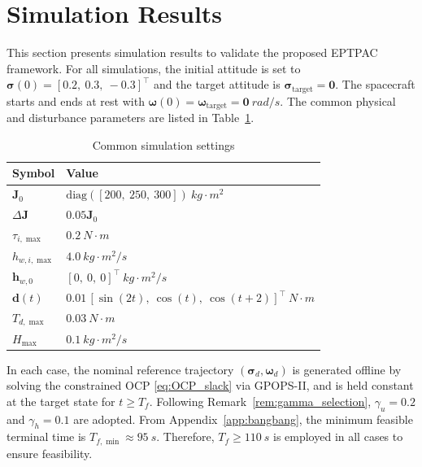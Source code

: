 \documentclass[journal]{new-aiaa}
\begin{document}

\section{Simulation Results}
\label{section:simulation}

This section presents simulation results to validate the proposed EPTPAC framework.
For all simulations, the initial attitude is set to $\boldsymbol{\sigma}(0)=[0.2,\ 0.3,\ -0.3]^\top$ and the target attitude is $\boldsymbol{\sigma}_{\mathrm{target}}=\boldsymbol{0}$. The spacecraft starts and ends at rest with $\boldsymbol{\omega}(0)=\boldsymbol{\omega}_{\mathrm{target}}=\boldsymbol{0}~\si{rad/s}$.
The common physical and disturbance parameters are listed in Table~\ref{tab:sim_setup_all}.

\begin{table}[ht]
\centering
\caption{Common simulation settings}
\label{tab:sim_setup_all}
\begin{tabular}{@{}l l@{}}
\toprule
\textbf{Symbol} & \textbf{Value} \\
\midrule
$\boldsymbol{J}_0$ &
$\mathrm{diag}([200,\ 250,\ 300])~\si{kg\cdot m^2}$ \\
$\Delta\boldsymbol{J}$ &
$0.05 \boldsymbol{J}_0 $ \\
$\tau_{i,\max}$ &
$\SI{0.2}{N\cdot m}$ \\
$h_{w,i,\max}$ &
$\SI{4.0}{kg\cdot m^2/s}$ \\
$\boldsymbol{h}_{w,0}$ &
$[0,\ 0,\ 0]^\top~\si{kg\cdot m^2/s}$ \\
$\boldsymbol{d}(t)$ &
$0.01\,[\sin(2t),\ \cos(t),\ \cos(t+2)]^\top~\si{N\cdot m}$ \\
$T_{d,\max}$ &
$\SI{0.03}{N\cdot m}$ \\
$H_{\max}$ &
$\SI{0.1}{kg\cdot m^2/s}$ \\\bottomrule
\end{tabular}
\end{table}

In each case, the nominal reference trajectory $(\boldsymbol{\sigma}_d,\boldsymbol{\omega}_d)$ is generated offline by solving the constrained OCP \eqref{eq:OCP_slack} via GPOPS-II, and is held constant at the target state for $t\ge T_f$.
Following Remark~\ref{rem:gamma_selection}, $\gamma_u=0.2$ and $\gamma_h=0.1$ are adopted.
From Appendix~\ref{app:bangbang}, the minimum feasible terminal time is $T_{f,\min}\approx\SI{95}{s}$. Therefore, $T_f\ge\SI{110}{s}$ is employed in all cases to ensure feasibility.
\end{document}
